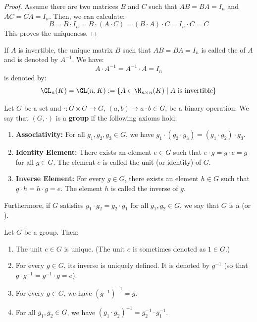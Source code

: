 \begin{proof}
Assume there are two matrices $B$ and $C$ such that $AB = BA = I_n$ and $AC = CA = I_n$. Then, we can calculate:
\begin{equation*}
    B = B \cdot I_n = B \cdot (A \cdot C) = (B \cdot A) \cdot C = I_n \cdot C = C
\end{equation*}
This proves the uniqueness.
\end{proof}

\begin{definition}
If $A$ is invertible, the unique matrix $B$ such that $AB = BA = I_n$ is called the  of $A$ and is denoted by $A^{-1}$. We have:
\begin{equation*}
    A \cdot A^{-1} = A^{-1} \cdot A = I_n
\end{equation*}
 is denoted by:
\begin{equation*}
    \GL_n(K) = \GL(n, K) := \{A \in \M_{n \times n}(K) \mid A \text{ is invertible}\}
\end{equation*}
\end{definition}

\begin{definition}[Group]
Let $G$ be a set and $\cdot : G \times G \to G$, $(a,b) \mapsto a \cdot b \in G$, be a binary operation. We say that $(G, \cdot)$ is a \textbf{group} if the following axioms hold:
\begin{enumerate}
    \item \textbf{Associativity:} For all $g_1, g_2, g_3 \in G$, we have $g_1 \cdot (g_2 \cdot g_3) = (g_1 \cdot g_2) \cdot g_3$.
    \item \textbf{Identity Element:} There exists an element $e \in G$ such that $e \cdot g = g \cdot e = g$ for all $g \in G$. The element $e$ is called the unit (or identity) of $G$.
    \item \textbf{Inverse Element:} For every $g \in G$, there exists an element $h \in G$ such that $g \cdot h = h \cdot g = e$. The element $h$ is called the inverse of $g$.
\end{enumerate}
Furthermore, if $G$ satisfies $g_1 \cdot g_2 = g_2 \cdot g_1$ for all $g_1, g_2 \in G$, we say that $G$ is a  (or ).
\end{definition}

\begin{proposition}
\label{prop:group_basic_properties}
Let $G$ be a group. Then:
\begin{enumerate}
    \item The unit $e \in G$ is unique. (The unit $e$ is sometimes denoted as $1 \in G$.)
    \item For every $g \in G$, its inverse is uniquely defined. It is denoted by $g^{-1}$ (so that $g \cdot g^{-1} = g^{-1} \cdot g = e$).
    \item For every $g \in G$, we have $(g^{-1})^{-1} = g$.
    \item For all $g_1, g_2 \in G$, we have $(g_1 \cdot g_2)^{-1} = g_2^{-1} \cdot g_1^{-1}$.
\end{enumerate}
\end{proposition}

